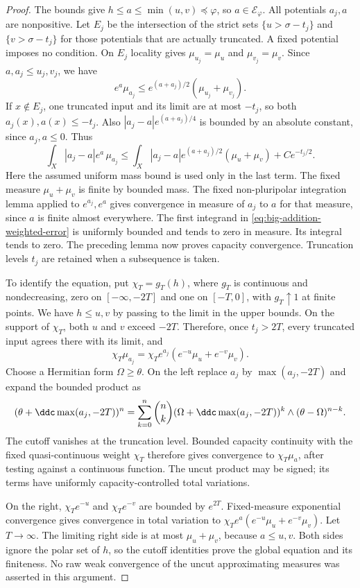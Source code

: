 \begin{proof}
The bounds give $h\leq a\leq\min(u,v)\preceq\varphi$, so $a\in\mathcal E_\varphi$. All potentials $a_j,a$ are nonpositive. Let $E_j$ be the intersection of the strict sets $\{u>\sigma-t_j\}$ and $\{v>\sigma-t_j\}$ for those potentials that are actually truncated. A fixed potential imposes no condition. On $E_j$ locality gives $\mu_{u_j}=\mu_u$ and $\mu_{v_j}=\mu_v$. Since $a,a_j\leq u_j,v_j$, we have
\[
 e^a\mu_{a_j}
 \leq e^{(a+a_j)/2}(\mu_{u_j}+\mu_{v_j}).
\]
If $x\notin E_j$, one truncated input and its limit are at most $-t_j$, so both $a_j(x),a(x)\leq-t_j$. Also $|a_j-a|e^{(a+a_j)/4}$ is bounded by an absolute constant, since $a_j,a\leq0$. Thus
\begin{equation}\label{eq:big-addition-weighted-error}
 \int_X|a_j-a|e^a\,\mu_{a_j}
 \leq\int_X|a_j-a|e^{(a+a_j)/2}(\mu_u+\mu_v)
       +C e^{-t_j/2}.
\end{equation}
Here the assumed uniform mass bound is used only in the last term. The fixed measure $\mu_u+\mu_v$ is finite by bounded mass. The fixed non-pluripolar integration lemma applied to $e^{a_j},e^a$ gives convergence in measure of $a_j$ to $a$ for that measure, since $a$ is finite almost everywhere. The first integrand in \eqref{eq:big-addition-weighted-error} is uniformly bounded and tends to zero in measure. Its integral tends to zero. The preceding lemma now proves capacity convergence. Truncation levels $t_j$ are retained when a subsequence is taken.

To identify the equation, put $\chi_T=g_T(h)$, where $g_T$ is continuous and nondecreasing, zero on $[-\infty,-2T]$ and one on $[-T,0]$, with $g_T\uparrow1$ at finite points. We have $h\leq u,v$ by passing to the limit in the upper bounds. On the support of $\chi_T$, both $u$ and $v$ exceed $-2T$. Therefore, once $t_j>2T$, every truncated input agrees there with its limit, and
\[
 \chi_T\mu_{a_j}
 =\chi_Te^{a_j}(e^{-u}\mu_u+e^{-v}\mu_v).
\]
Choose a Hermitian form $\Omega\geq\theta$. On the left replace $a_j$ by $\max(a_j,-2T)$ and expand the bounded product as
\[
 (\theta+\ddc\max(a_j,-2T))^n
 =\sum_{k=0}^n\binom nk
   (\Omega+\ddc\max(a_j,-2T))^k\wedge(\theta-\Omega)^{n-k}.
\]
The cutoff vanishes at the truncation level. Bounded capacity continuity with the fixed quasi-continuous weight $\chi_T$ therefore gives convergence to $\chi_T\mu_a$, after testing against a continuous function. The uncut product may be signed; its terms have uniformly capacity-controlled total variations.

On the right, $\chi_T e^{-u}$ and $\chi_T e^{-v}$ are bounded by $e^{2T}$. Fixed-measure exponential convergence gives convergence in total variation to
$\chi_Te^a(e^{-u}\mu_u+e^{-v}\mu_v)$. Let $T\to\infty$. The limiting right side is at most $\mu_u+\mu_v$, because $a\leq u,v$. Both sides ignore the polar set of $h$, so the cutoff identities prove the global equation and its finiteness. No raw weak convergence of the uncut approximating measures was asserted in this argument.
\end{proof}
